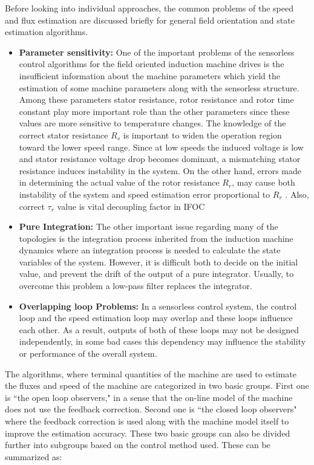 Before looking into individual approaches, the common problems of the speed and flux estimation are discussed briefly for general field orientation and state estimation algorithms.
 \begin{itemize}
 \item{\textbf{Parameter sensitivity:} One of the important problems of the sensorless control algorithms for the field oriented induction machine drives is the insufficient information about the machine parameters which yield the estimation of some machine parameters along with the sensorless structure. Among these parameters stator resistance, rotor resistance and rotor time constant play more important role than the other parameters since these values are more sensitive to temperature changes. The knowledge of the correct stator resistance $R_{s}$ is important to widen the
operation region toward the lower speed range. Since at low speeds the induced voltage is low and stator resistance voltage drop becomes dominant, a mismatching stator resistance induces instability in the system. On the other hand, errors made in determining the actual value of the rotor resistance $R_{r}$, may cause both instability of the system and speed estimation error proportional to $R_{r}$ \cite{gy}. Also, correct $\tau_{r}$ value is vital decoupling factor in IFOC}
 
\item{\textbf{Pure Integration:} The other important issue regarding many of the topologies is the integration process inherited from the induction machine dynamics where an integration process is needed to calculate the state variables of the system. However, it is difficult both to decide on the initial value, and prevent the drift of the output of a pure integrator. Usually, to overcome this problem a low-pass filter replaces the integrator.}

\item{\textbf{Overlapping loop Problems:} In a sensorless control system, the control loop and the speed estimation loop may overlap and these loops influence each other. As a result, outputs of both of these loops may not be designed independently,  in some bad cases this dependency may influence the stability or performance of the overall system.}
\end{itemize}
\vspace{1cm}
The algorithms, where terminal quantities of the machine are used to estimate the fluxes and speed of the machine are categorized in two basic groups. First one is ``the open loop observers," in a sense that the on-line model of the machine does not use the feedback correction. Second one is ``the closed loop observers" where the feedback correction is used along with the machine model itself to improve the estimation accuracy. These two basic groups can also be divided further into subgroups based on the control method used. These can be summarized as:\\

